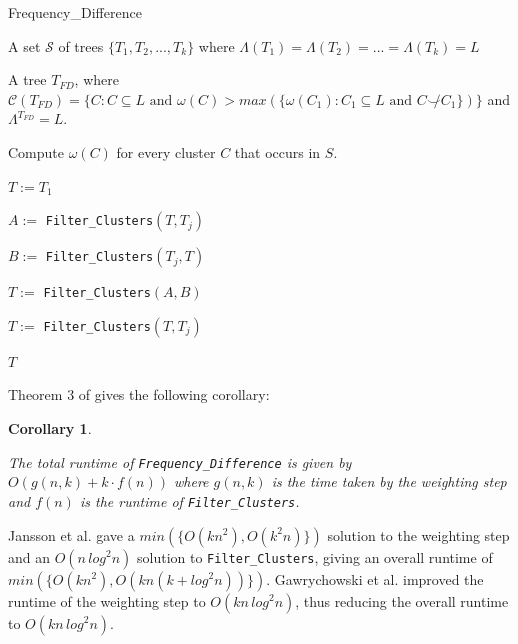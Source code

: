 \documentclass{article}
\newcommand{\compatible}{\smile}
\newcommand{\leafset}{\Lambda}
\newcommand{\weight}{\omega}
\newtheorem{freqdiffruntimecomponents}[incompatibility]{Corollary}
\begin{document}
    \begin{algorithm}
        \caption{Frequency\_Difference}
        \label{alg:frequencydifference}

        \begin{algorithmic}[1]
            \Input A set $\mathcal{S}$ of trees $\{T_1, T_2, ..., T_k\}$ where $\leafset(T_1) = \leafset(T_2) = ... = \leafset(T_k) = L$

            \Output A tree $T_{FD}$, where $\mathcal{C}(T_{FD}) = \{C : C \subseteq L \text{ and } \weight(C) > max(\{\weight(C_1) : C_1 \subseteq L \text{ and } C \not\compatible C_1\})\}$ and $\leafset^{T_{FD}} = L$.

            \State Compute $\weight(C)$ for every cluster $C$ that occurs in $S$.

            \State $T := T_1$

                \State $A :=$ \texttt{Filter\_Clusters}$(T, T_j)$

                \State $B :=$ \texttt{Filter\_Clusters}$(T_j, T)$

                \State $T :=$ \texttt{Filter\_Clusters}$(A, B)$
            \EndFor

                \State $T :=$ \texttt{Filter\_Clusters}$(T, T_j)$
            \EndFor

            \State \Return $T$
        \end{algorithmic}
    \end{algorithm}

    Theorem 3 of \cite{jansson2018algorithms} gives the following corollary:
    \newline

    \begin{freqdiffruntimecomponents}
        \label{cor:freqdiffruntimecomponents}

        The total runtime of \texttt{Frequency\_Difference} is given by $O(g(n, k) + k \cdot f(n))$ where $g(n, k)$ is the time taken by the weighting step and $f(n)$ is the runtime of \texttt{Filter\_Clusters}.
    \end{freqdiffruntimecomponents}

    Jansson et al. \cite{jansson2018algorithms} gave a $min(\{O(kn^2), O(k^2n)\})$ solution to the weighting step and an $O(n\,log^2n)$ solution to \texttt{Filter\_Clusters}, giving an overall runtime of $min(\{O(kn^2), O(kn(k + log^2n))\})$. Gawrychowski et al. \cite{gawrychowski2017faster} improved the runtime of the weighting step to $O(kn\,log^2n)$, thus reducing the overall runtime to $O(kn\,log^2n)$.
\end{document}
